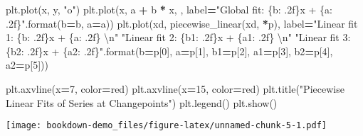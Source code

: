 \documentclass[
]{book}
\newenvironment{Shaded}{\begin{snugshade}}{\end{snugshade}}
\newcommand{\BuiltInTok}[1]{#1}
\newcommand{\CharTok}[1]{\textcolor[rgb]{0.31,0.60,0.02}{#1}}
\newcommand{\DecValTok}[1]{\textcolor[rgb]{0.00,0.00,0.81}{#1}}
\newcommand{\NormalTok}[1]{#1}
\newcommand{\OperatorTok}[1]{\textcolor[rgb]{0.81,0.36,0.00}{\textbf{#1}}}
\newcommand{\SpecialCharTok}[1]{\textcolor[rgb]{0.00,0.00,0.00}{#1}}
\newcommand{\StringTok}[1]{\textcolor[rgb]{0.31,0.60,0.02}{#1}}
\theoremstyle{definition}
\theoremstyle{definition}
\theoremstyle{definition}
\theoremstyle{remark}
\begin{document}
\begin{Shaded}
\begin{Highlighting}[]
\NormalTok{plt.plot(x, y, }\StringTok{"o"}\NormalTok{)}
\NormalTok{plt.plot(x, a }\OperatorTok{+}\NormalTok{ b }\OperatorTok{*}\NormalTok{ x, }\StringTok{\textquotesingle{}{-}{-}\textquotesingle{}}\NormalTok{, label}\OperatorTok{=}\StringTok{"Global fit: }\SpecialCharTok{\{b: .2f\}}\StringTok{x + }\SpecialCharTok{\{a: .2f\}}\StringTok{"}\NormalTok{.}\BuiltInTok{format}\NormalTok{(b}\OperatorTok{=}\NormalTok{b, a}\OperatorTok{=}\NormalTok{a))}
\NormalTok{plt.plot(xd, piecewise\_linear(xd, }\OperatorTok{*}\NormalTok{p), label}\OperatorTok{=}\StringTok{"Linear fit 1: }\SpecialCharTok{\{b: .2f\}}\StringTok{x + }\SpecialCharTok{\{a: .2f\}}\StringTok{ }\CharTok{\textbackslash{}n}\StringTok{"}
                                             \StringTok{"Linear fit 2: }\SpecialCharTok{\{b1: .2f\}}\StringTok{x + }\SpecialCharTok{\{a1: .2f\}}\StringTok{ }\CharTok{\textbackslash{}n}\StringTok{"}
                                             \StringTok{"Linear fit 3: }\SpecialCharTok{\{b2: .2f\}}\StringTok{x + }\SpecialCharTok{\{a2: .2f\}}\StringTok{"}\NormalTok{.}\BuiltInTok{format}\NormalTok{(b}\OperatorTok{=}\NormalTok{p[}\DecValTok{0}\NormalTok{], a}\OperatorTok{=}\NormalTok{p[}\DecValTok{1}\NormalTok{],}
\NormalTok{                                                                                          b1}\OperatorTok{=}\NormalTok{p[}\DecValTok{2}\NormalTok{], a1}\OperatorTok{=}\NormalTok{p[}\DecValTok{3}\NormalTok{],}
\NormalTok{                                                                                          b2}\OperatorTok{=}\NormalTok{p[}\DecValTok{4}\NormalTok{], a2}\OperatorTok{=}\NormalTok{p[}\DecValTok{5}\NormalTok{]))}
                                                                              
\NormalTok{plt.axvline(x}\OperatorTok{=}\DecValTok{7}\NormalTok{, color}\OperatorTok{=}\StringTok{\textquotesingle{}red\textquotesingle{}}\NormalTok{)}
\NormalTok{plt.axvline(x}\OperatorTok{=}\DecValTok{15}\NormalTok{, color}\OperatorTok{=}\StringTok{\textquotesingle{}red\textquotesingle{}}\NormalTok{)}
\NormalTok{plt.title(}\StringTok{"Piecewise Linear Fits of Series at Changepoints"}\NormalTok{)}
\NormalTok{plt.legend()}
\NormalTok{plt.show()}
\end{Highlighting}
\end{Shaded}

\texttt{[image: bookdown-demo\_files/figure-latex/unnamed-chunk-5-1.pdf]}
\end{document}
